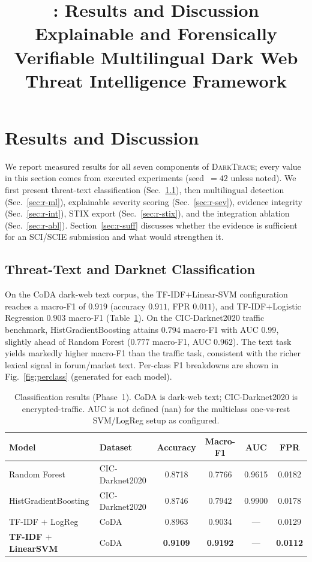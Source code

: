\documentclass[11pt,a4paper]{article}
\title{\framework{}: Results and Discussion\\
\large Explainable and Forensically Verifiable Multilingual Dark Web\\
Threat Intelligence Framework}
\author{}
\date{}
\newcommand{\framework}{\textsc{DarkTrace}}
\begin{document}
\maketitle

\section{Results and Discussion}\label{sec:results}

We report measured results for all seven components of \framework{}; every value in
this section comes from executed experiments (seed~$=42$ unless noted). We first present
threat-text classification (Sec.~\ref{sec:r-cls}), then multilingual detection
(Sec.~\ref{sec:r-ml}), explainable severity scoring (Sec.~\ref{sec:r-sev}), evidence
integrity (Sec.~\ref{sec:r-int}), STIX export (Sec.~\ref{sec:r-stix}), and the
integration ablation (Sec.~\ref{sec:r-abl}). Section~\ref{sec:r-suff} discusses whether
the evidence is sufficient for an SCI/SCIE submission and what would strengthen it.

\subsection{Threat-Text and Darknet Classification}\label{sec:r-cls}
On the CoDA dark-web text corpus, the TF-IDF$+$Linear-SVM configuration reaches a
macro-F1 of $0.919$ (accuracy $0.911$, FPR $0.011$), and TF-IDF$+$Logistic Regression
$0.903$ macro-F1 (Table~\ref{tab:r-cls}). On the CIC-Darknet2020 traffic benchmark,
HistGradientBoosting attains $0.794$ macro-F1 with AUC $0.99$, slightly ahead of Random
Forest ($0.777$ macro-F1, AUC $0.962$). The text task yields markedly higher macro-F1
than the traffic task, consistent with the richer lexical signal in forum/market text.
Per-class F1 breakdowns are shown in
Fig.~\ref{fig:perclass} (generated for each model).

\begin{table}[h]
\centering
\caption{Classification results (Phase~1). CoDA is dark-web text; CIC-Darknet2020 is
encrypted-traffic. AUC is not defined (nan) for the multiclass one-vs-rest SVM/LogReg
setup as configured.}
\label{tab:r-cls}
\small
\begin{tabular}{@{}llcccc@{}}
\toprule
\textbf{Model} & \textbf{Dataset} & \textbf{Accuracy} & \textbf{Macro-F1} & \textbf{AUC} & \textbf{FPR} \\
\midrule
Random Forest          & CIC-Darknet2020 & 0.8718 & 0.7766 & 0.9615 & 0.0182 \\
HistGradientBoosting   & CIC-Darknet2020 & 0.8746 & 0.7942 & 0.9900 & 0.0178 \\
TF-IDF $+$ LogReg       & CoDA            & 0.8963 & 0.9034 & ---    & 0.0129 \\
\textbf{TF-IDF $+$ LinearSVM} & CoDA      & \textbf{0.9109} & \textbf{0.9192} & --- & \textbf{0.0112} \\
\bottomrule
\end{tabular}
\end{table}
\end{document}
